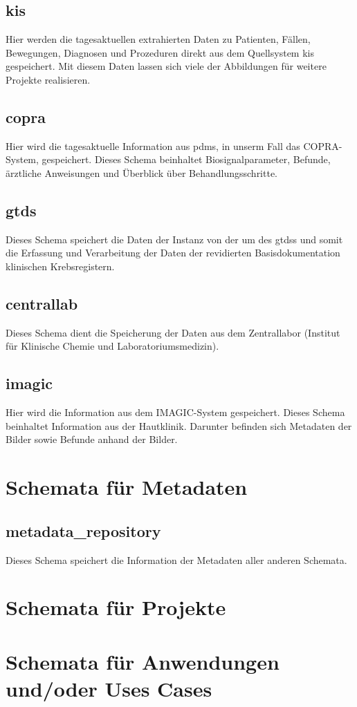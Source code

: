   \subsection{kis} \label{subsec:kis}
   Hier werden die tagesaktuellen extrahierten Daten zu Patienten, Fällen, Bewegungen, Diagnosen und Prozeduren direkt aus dem Quellsystem \ac{kis} gespeichert. Mit diesem Daten lassen sich viele der Abbildungen für weitere Projekte realisieren.
  
  \subsection{copra} \label{subsec:copra}
  Hier wird die tagesaktuelle Information aus \ac{pdms}, in unserm Fall das COPRA-System, gespeichert. Dieses Schema beinhaltet Biosignalparameter, Befunde, ärztliche Anweisungen und Überblick über Behandlungsschritte.


  \subsection{gtds} \label{subsec:gtds}
  Dieses Schema speichert die Daten der Instanz von der \ac{um} des \acf{gtdss} und somit die Erfassung und Verarbeitung der Daten der revidierten Basisdokumentation klinischen Krebsregistern.

  	\subsection{centrallab} \label{subsec:centrallab}
  Dieses Schema dient die Speicherung der Daten aus dem Zentrallabor (Institut für Klinische Chemie und Laboratoriumsmedizin).

	\subsection{imagic} \label{subsec:imagic}
	Hier wird die Information aus dem IMAGIC-System gespeichert. Dieses Schema beinhaltet Information aus der Hautklinik. Darunter befinden sich Metadaten der Bilder sowie Befunde anhand der Bilder.

	\section{Schemata für Metadaten} \label{sc:metadata}
	
	\subsection{metadata\_repository} \label{subsec:metarep}
 	Dieses Schema speichert die Information der Metadaten aller anderen Schemata.

  \section{Schemata für Projekte}
  
  \section{Schemata für Anwendungen und/oder Uses Cases}
